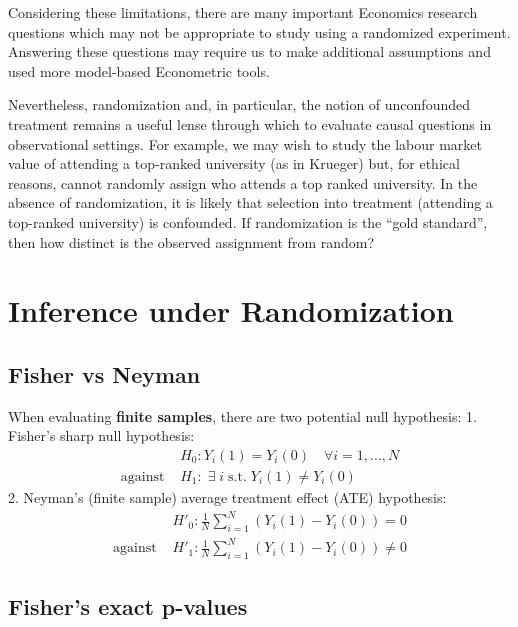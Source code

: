 \documentclass[
  letterpaper,
  DIV=11,
  numbers=noendperiod]{scrreprt}
\theoremstyle{definition}
\theoremstyle{remark}
\begin{document}
Considering these limitations, there are many important Economics
research questions which may not be appropriate to study using a
randomized experiment. Answering these questions may require us to make
additional assumptions and used more model-based Econometric tools.

Nevertheless, randomization and, in particular, the notion of
unconfounded treatment remains a useful lense through which to evaluate
causal questions in observational settings. For example, we may wish to
study the labour market value of attending a top-ranked university (as
in Krueger) but, for ethical reasons, cannot randomly assign who attends
a top ranked university. In the absence of randomization, it is likely
that selection into treatment (attending a top-ranked university) is
confounded. If randomization is the ``gold standard'', then how distinct
is the observed assignment from random?

\section{Inference under
Randomization}\label{inference-under-randomization}

\subsection{Fisher vs Neyman}\label{fisher-vs-neyman}

When evaluating \textbf{finite samples}, there are two potential null
hypothesis: 1. Fisher's sharp null hypothesis: \[
            \begin{align*}
                &H_0: Y_i(1)=Y_i(0) \quad\forall i=1,...,N \\
                \text{against }&H_1:\;\exists\;i\; \text{s.t.}\;Y_i(1)\neq Y_i(0)
            \end{align*}
            \] 2. Neyman's (finite sample) average treatment effect
(ATE) hypothesis: \[
            \begin{align*}
                &H'_0: \frac{1}{N}\sum_{i=1}^{N}(Y_i(1)-Y_i(0))=0 \\
                \text{against }&H'_1:\frac{1}{N}\sum_{i=1}^{N}(Y_i(1)-Y_i(0))\neq0
        \end{align*}
          \]

\subsection{Fisher's exact p-values}\label{fishers-exact-p-values}
\end{document}
